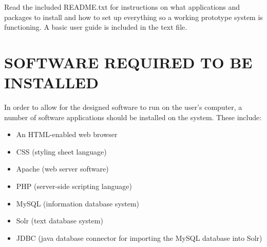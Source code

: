 \documentclass[journal,comsoc]{IEEEtran}
\begin{document}
\hfill \break Read the included README.txt for instructions on what applications and packages to install and how to set up everything so a working prototype system is functioning. A basic user guide is included in the text file.
\\


\section{SOFTWARE REQUIRED TO BE INSTALLED}

In order to allow for the designed software to run on the user's computer, a number of software applications should be installed on the system. These include: \vspace{2mm}
\begin{itemize}
	\item An HTML-enabled web browser
	\item CSS (styling sheet language)
	\item Apache (web server software)
	\item PHP (server-side scripting language)
	\item MySQL (information database system)
	\item Solr (text database system)
	\item JDBC (java database connector for importing the MySQL database into Solr)
\end{itemize}

\end{document}
